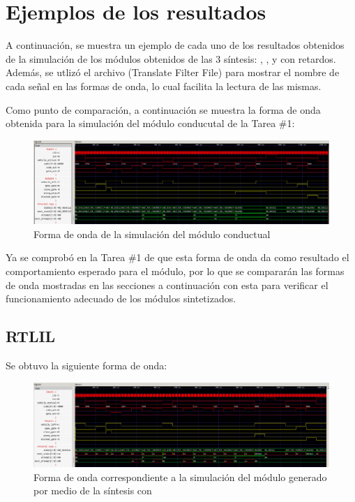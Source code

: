 \section{Ejemplos de los resultados}
A continuación, se muestra un ejemplo de cada uno de los resultados obtenidos de la simulación de los módulos obtenidos de las 3 síntesis: , , y  con retardos.
Además, se utlizó el archivo  (Translate Filter File) para mostrar el nombre de cada señal en las formas de onda, lo cual facilita la lectura de las mismas.

Como punto de comparación, a continuación se muestra la forma de onda obtenida para la simulación del módulo conducutal de la Tarea \#1:

\begin{figure}[!h]
    \centering
\includegraphics[width = 1\linewidth]{figs/sim.png}
\caption{Forma de onda de la simulación del módulo conductual }
    \label{behavioral}
\end{figure}

Ya se comprobó en la Tarea \#1 de que esta forma de onda da como resultado el comportamiento esperado para el módulo, por lo que se compararán las formas de onda mostradas en las secciones a continuación con esta para verificar el funcionamiento adecuado de los módulos sintetizados.

\newpage

\subsection{RTLIL}
Se obtuvo la siguiente forma de onda:

\begin{figure}[!h]
    \centering
    \includegraphics[width = \linewidth]{figs/rtlil.png}
    \caption{Forma de onda correspondiente a la simulación del módulo generado por medio de la síntesis con }
    \label{fig3}
\end{figure}


